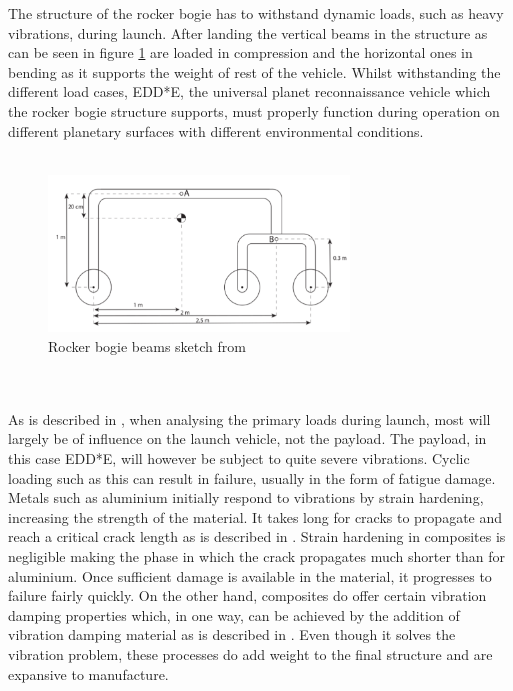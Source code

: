 The structure of the rocker bogie has to withstand dynamic loads, such as heavy vibrations, during launch. After landing the vertical beams in the structure as can be seen in figure \ref{rockerbogiesketch} are loaded in compression and the horizontal ones in bending as it supports the weight of rest of the vehicle. Whilst withstanding the different load cases, EDD*E, the universal planet reconnaissance vehicle which the rocker bogie structure supports, must properly function during operation on different planetary surfaces with different environmental conditions.
\\
\\
\begin{figure}
    \centering
    \includegraphics[width=8cm]{figures/Rockerbogiesketch.png}
    \caption{Rocker bogie beams sketch from \cite{project-manual}}
    \label{rockerbogiesketch}
\end{figure}
\\
\\
As is described in \cite{alderliesten-introduction-to-aerospace-structures-and-materials}, when analysing the primary loads during launch, most will largely be of influence on the launch vehicle, not the payload. The payload, in this case EDD*E, will however be subject to quite severe vibrations. Cyclic loading such as this can result in failure, usually in the form of fatigue damage. Metals such as aluminium initially respond to vibrations by strain hardening, increasing the strength of the material. It takes long for cracks to propagate and reach a critical crack length as is described in \cite{ashby-aerospace-materials}. Strain hardening in composites is negligible making the phase in which the crack propagates much shorter than for aluminium. Once sufficient damage is available in the material, it progresses to failure fairly quickly. On the other hand, composites do offer certain vibration damping properties which, in one way, can be achieved by the addition of vibration damping material as is described in \cite{Sound-and-vibration-damping}. Even though it solves the vibration problem, these processes do add weight to the final structure and are expansive to manufacture. 
